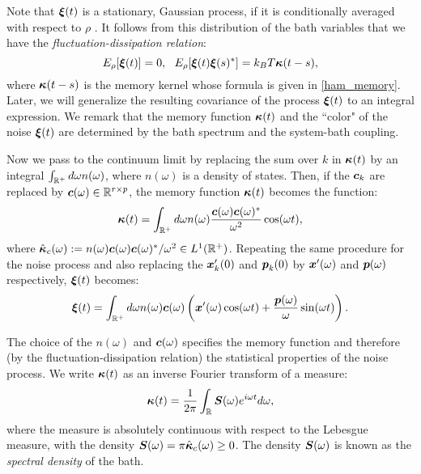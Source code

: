 Note that $\boldsymbol{\xi}(t)$ is a stationary, Gaussian process, if it is conditionally averaged with respect to $\rho$ \cite{zwanzig2001nonequilibrium}. It follows from this distribution of the bath variables that we have the  {\it fluctuation-dissipation relation}:
\begin{equation}E_{\rho}[\vecc{\xi}(t)] = 0, \ \ E_{\rho}[\vecc{\xi}(t)\vecc{\xi}(s)^{*}]=k_{B}T\vecc{\kappa}(t-s),\end{equation} 
where $\boldsymbol{\kappa}(t-s)$ is the memory kernel whose formula is given in \eqref{ham_memory}. Later, we will generalize the resulting covariance of the process $\boldsymbol{\xi}(t)$ to an integral expression. 
We remark that the memory function $\boldsymbol{\kappa}(t)$ and  the ``color" of the noise $\boldsymbol{\xi}(t)$ are determined by the bath spectrum and the system-bath coupling. 

Now we pass to the continuum limit by replacing the sum over $k$ in $\boldsymbol{\kappa}(t)$ by an integral $\int_{\mathbb{R}^{+}} d\omega n(\omega)$, where $n(\omega)$ is a density of states.  Then, if the $\boldsymbol{c}_k$ are replaced by $\boldsymbol{c}(\omega) \in \mathbb{R}^{r \times p}$, the memory function $\boldsymbol{\kappa}(t)$ becomes the function:
\begin{equation}\boldsymbol{\kappa}(t) = \int_{\mathbb{R}^{+}} d\omega n(\omega) \frac{\boldsymbol{c}(\omega) \boldsymbol{c}(\omega)^{*}}{\omega^2} \cos(\omega t), \end{equation}
where $\hat{\boldsymbol{\kappa}}_c(\omega) :=  n(\omega) \boldsymbol{c}(\omega) \boldsymbol{c}(\omega)^*/\omega^2 \in L^1(\mathbb{R}^+)$.  Repeating the same procedure for the noise process and also replacing the $\boldsymbol{x}'_k(0)$ and $\boldsymbol{p}_k(0)$ by $\boldsymbol{x}'(\omega)$ and $\boldsymbol{p}(\omega)$ respectively, $\boldsymbol{\xi}(t)$ becomes:
 \begin{equation} \label{limit_noise}
 \boldsymbol{\xi}(t) = \int_{\mathbb{R}^+} d\omega n(\omega) \boldsymbol{c}(\omega) \left(  \boldsymbol{x}'(\omega)  \cos(\omega t) + \frac{\boldsymbol{p}(\omega)}{ \omega} \sin(\omega t) \right). \end{equation}


The choice of the $n(\omega)$ and $\boldsymbol{c}(\omega)$ specifies the memory function and therefore (by the fluctuation-dissipation relation) the statistical properties of the noise process. We write $\boldsymbol{\kappa}(t)$ as an inverse Fourier transform of a measure:
\begin{equation} \label{memory}
\boldsymbol{\kappa}(t) = \frac{1}{2\pi} \int_{\mathbb{R}} \boldsymbol{S}(\omega) e^{i \omega t} d\omega,  
\end{equation}
where the measure is absolutely continuous with respect to the Lebesgue measure, with the density
$\boldsymbol{S}(\omega) = \pi \hat{\boldsymbol{\kappa}}_c(\omega) \geq 0$. The density $\boldsymbol{S}(\omega)$ is known as the {\it spectral density} of the bath. 

